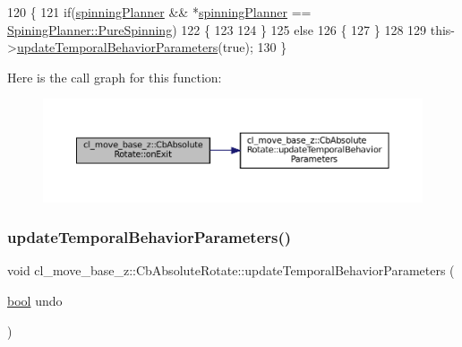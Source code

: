 \begin{DoxyCode}
120 \{
121     \textcolor{keywordflow}{if}(\hyperlink{classcl__move__base__z_1_1CbAbsoluteRotate_a17d836524599af072cf2e3488e491a91}{spinningPlanner} && *\hyperlink{classcl__move__base__z_1_1CbAbsoluteRotate_a17d836524599af072cf2e3488e491a91}{spinningPlanner} == 
      \hyperlink{namespacecl__move__base__z_aab2ad3041275145f0065fb60b3299345aada5274435681a4ce04175bebfa6652f}{SpiningPlanner::PureSpinning})
122     \{
123 
124     \}
125     \textcolor{keywordflow}{else}
126     \{    
127     \}
128 
129     this->\hyperlink{classcl__move__base__z_1_1CbAbsoluteRotate_a2d8a4200dcacc00ad60c22ad2af5d4b2}{updateTemporalBehaviorParameters}(\textcolor{keyword}{true});
130 \}
\end{DoxyCode}
Here is the call graph for this function\+:
\nopagebreak
\begin{figure}[H]
\begin{center}
\leavevmode
\includegraphics[width=350pt]{classcl__move__base__z_1_1CbAbsoluteRotate_a0e362b8e9f0d7de5aeee183ba4031437_cgraph}
\end{center}
\end{figure}
\mbox{\label{classcl__move__base__z_1_1CbAbsoluteRotate_a2d8a4200dcacc00ad60c22ad2af5d4b2}} 
\subsubsection{\texorpdfstring{update\+Temporal\+Behavior\+Parameters()}{updateTemporalBehaviorParameters()}}
{\footnotesize\ttfamily void cl\+\_\+move\+\_\+base\+\_\+z\+::\+Cb\+Absolute\+Rotate\+::update\+Temporal\+Behavior\+Parameters (\begin{DoxyParamCaption}\item[{\hyperlink{classbool}{bool}}]{undo }\end{DoxyParamCaption})\hspace{0.3cm}{\ttfamily [private]}}



